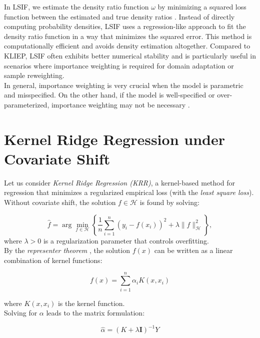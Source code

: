 In LSIF, we estimate the density ratio function $\omega$ by minimizing a squared loss function between the estimated and true density ratios \citep{kanamori2009lsif}. Instead of directly computing probability densities, LSIF uses a regression-like approach to fit the density ratio function in a way that minimizes the squared error. This method is computationally efficient and avoids density estimation altogether. Compared to KLIEP, LSIF often exhibits better numerical stability and is particularly useful in scenarios where importance weighting is required for domain adaptation or sample reweighting.\\


In general, importance weighting is very crucial when the model is parametric and misspecified. On the other hand, if the model is well-specified or over-parameterized, importance weighting may not be necessary \citep{gogolashvili2023importance}.


\section{Kernel Ridge Regression under Covariate Shift}
Let us consider \emph{Kernel Ridge Regression (KRR)}, a kernel-based method for regression that minimizes a regularized empirical loss (with the \textit{least square loss}). Without covariate shift, the solution $f \in \mathcal{H}$ is found by solving:

\begin{equation}
    \hat{f} = \arg\min_{f \in \mathcal{H}} \left\{ \frac{1}{n} \sum_{i=1}^{n} (y_i - f(x_i))^2 + \lambda \| f \|_{\mathcal{H}}^2 \right\},
    \label{eqn:3.18}
\end{equation}
where $\lambda > 0$ is a regularization parameter that controls overfitting.\\

By the \emph{representer theorem} \citep{kimeldorf1971some}, the solution $f(x)$ can be written as a linear combination of kernel functions:

\begin{equation}
    f(x) = \sum_{i=1}^n \alpha_i K(x, x_i)
    \label{eqn:3.19}
\end{equation}

where $K(x, x_i)$ is the kernel function. \\

Solving for $\alpha$ leads to the matrix formulation:

\begin{equation}
    \hat{\alpha} = (K + \lambda \mathbf{I})^{-1}Y
    \label{eqn:3.20}
\end{equation}

